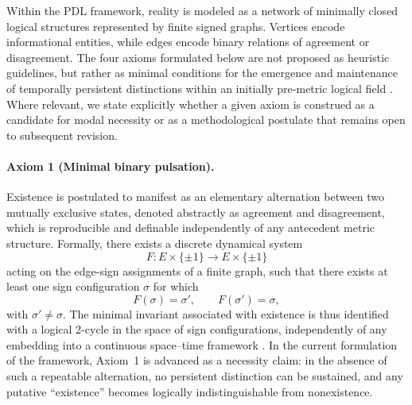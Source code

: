 \documentclass[11pt,a4paper]{article}
\begin{document}
Within the PDL framework, reality is modeled as a network of minimally closed logical structures represented by finite signed graphs. Vertices encode informational entities, while edges encode binary relations of agreement or disagreement. The four axioms formulated below are not proposed as heuristic guidelines, but rather as minimal conditions for the emergence and maintenance of temporally persistent distinctions within an initially pre-metric logical field \cite{Laubscher_PDL_long,Laubscher_LDP_fr}. Where relevant, we state explicitly whether a given axiom is construed as a candidate for modal necessity or as a methodological postulate that remains open to subsequent revision.

\paragraph{Axiom 1 (Minimal binary pulsation).}
Existence is postulated to manifest as an elementary alternation between two mutually exclusive states, denoted abstractly as agreement and disagreement, which is reproducible and definable independently of any antecedent metric structure. Formally, there exists a discrete dynamical system
\[
F : E \times \{\pm 1\} \to E \times \{\pm 1\}
\]
acting on the edge-sign assignments of a finite graph, such that there exists at least one sign configuration \(\sigma\) for which
\[
F(\sigma) = \sigma', \qquad F(\sigma') = \sigma,
\]
with \(\sigma' \neq \sigma\). The minimal invariant associated with existence is thus identified with a logical 2-cycle in the space of sign configurations, independently of any embedding into a continuous space–time framework \cite{Laubscher_PDL_IMRad}. In the current formulation of the framework, Axiom~1 is advanced as a necessity claim: in the absence of such a repeatable alternation, no persistent distinction can be sustained, and any putative ``existence'' becomes logically indistinguishable from nonexistence.
\end{document}
